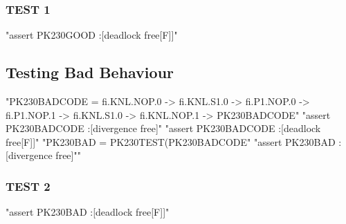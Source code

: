 \subsubsection{TEST 1}

\begin{assert}
"assert PK230GOOD :[deadlock free[F]]"
\end{assert}

\subsection{Testing Bad Behaviour}

\begin{assert}
"PK230BADCODE = fi.KNL.NOP.0 -> fi.KNL.S1.0 -> fi.P1.NOP.0 -> fi.P1.NOP.1 -> fi.KNL.S1.0 -> fi.KNL.NOP.1 -> PK230BADCODE"
\also "assert PK230BADCODE :[divergence free]"
\also "assert PK230BADCODE :[deadlock free[F]]"
\also "PK230BAD = PK230TEST(PK230BADCODE"
\also "assert PK230BAD :[divergence free]""
\end{assert}


\subsubsection{TEST 2}
\begin{assert}
"assert PK230BAD :[deadlock free[F]]"
\end{assert}
